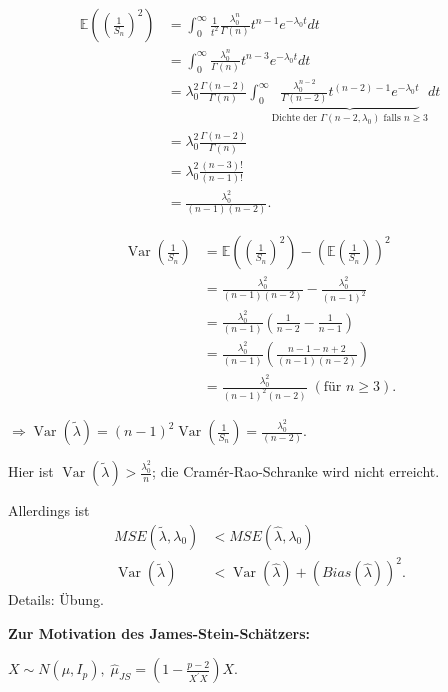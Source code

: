 \documentclass{tstextbook}
\DeclareMathOperator{\Var}{Var}
\newcommand{\E}{\mathbb E}
\begin{document}
\begin{example}
	\[
	\begin{aligned}
		\E\left(\left(\frac{1}{S_n}\right)^2\right) & = \int_{0}^{\infty} \frac{1}{t^2}\frac{\lambda_0^n}{\Gamma(n)}t^{n-1}e^{-\lambda_0t}dt \\
		& = \int_{0}^{\infty} \frac{\lambda_0^n}{\Gamma(n)}t^{n-3}e^{-\lambda_0t}dt \\
		& = \lambda_0^2 \frac{\Gamma(n-2)}{\Gamma(n)} \int_{0}^{\infty} \underbrace{\frac{\lambda_0^{n-2}}{\Gamma(n-2)}t^{(n-2)-1}e^{-\lambda_0t}}_{\text{Dichte der }\Gamma(n-2,\lambda_0) \text{ falls }n\ge3} dt \\
		& = \lambda_0^2 \frac{\Gamma(n-2)}{\Gamma(n)} \\
		& = \lambda_0^2 \frac{(n-3)!}{(n-1)!} \\
		& = \frac{\lambda_0^2}{(n-1)(n-2)}.
	\end{aligned}
	\]
	
	\[
	\begin{aligned}
		\Var\left(\frac{1}{S_n}\right) & = \E\left(\left(\frac{1}{S_n}\right)^2\right) - \left(\E\left(\frac{1}{S_n}\right)\right)^2 \\
		& = \frac{\lambda_0^2}{(n-1)(n-2)} - \frac{\lambda_0^2}{(n-1)^2} \\
		& = \frac{\lambda_0^2}{(n-1)}\left(\frac{1}{n-2}-\frac{1}{n-1}\right) \\
		& = \frac{\lambda_0^2}{(n-1)}\left(\frac{n-1-n+2}{(n-1)(n-2)}\right) \\
		& = \frac{\lambda_0^2}{(n-1)^2(n-2)} \; (\text{für }n\ge3).
	\end{aligned}
	\]
	
	$ \Rightarrow \Var(\tilde{\lambda}) = (n-1)^2\Var\left(\frac{1}{S_n}\right) = \frac{\lambda_0^2}{(n-2)} $. 
	
	Hier ist $ \Var(\tilde{\lambda}) > \frac{\lambda_0^2}{n} $; die Cramér-Rao-Schranke wird nicht erreicht.
	
	Allerdings ist 
	\[
	\begin{aligned}
		MSE(\tilde{\lambda},\lambda_0) & < MSE(\hat{\lambda},\lambda_0) \\
		\Var(\tilde{\lambda}) & < \Var(\hat{\lambda}) + (Bias(\hat{\lambda}))^2.
	\end{aligned}
	\]
	Details: Übung.
\end{example}

\textbf{Zur Motivation des James-Stein-Schätzers:}

	$ X\sim N(\mu,I_p), \; \hat{\mu}_{JS} = \left(1-\frac{p-2}{X^\prime X}\right)X $. 
	
\end{document}
